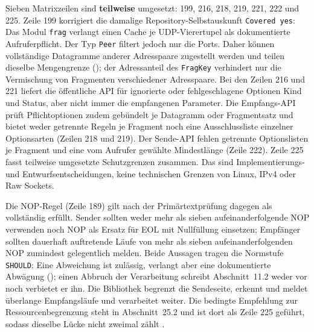 Sieben Matrixzeilen sind \textbf{teilweise} umgesetzt: 199, 216, 218, 219, 221, 222 und 225. Zeile 199
korrigiert die damalige Repository-Selbstauskunft \texttt{Covered yes}: Das Modul \texttt{frag} verlangt
einen Cache je UDP-Vierertupel als dokumentierte Aufrufer\-pflicht. Der Typ \texttt{Peer} filtert jedoch
nur die Ports. Daher können vollständige Datagramme anderer Adresspaare zugestellt werden und teilen
dieselbe Mengengrenze (); der Adressanteil des \texttt{FragKey} verhindert
nur die Vermischung von Fragmenten verschiedener Adresspaare. Bei den
Zeilen 216 und 221 liefert die öffentliche
API für ignorierte oder fehlgeschlagene Optionen Kind und Status, aber nicht immer die empfangenen
Parameter. Die Empfangs-API prüft Pflichtoptionen zudem gebündelt je Datagramm oder Fragmentsatz und
bietet weder getrennte Regeln je Fragment noch eine Ausschlussliste einzelner Options\-arten (Zeilen 218
und 219). Der Sende-API fehlen getrennte Optionslisten je Fragment und eine vom Aufrufer gewählte
Mindestlänge (Zeile 222). Zeile 225 fasst teilweise umgesetzte Schutzgrenzen zusammen. Das sind
Implementierungs- und Entwurfsentscheidungen, keine technischen Grenzen von Linux, IPv4 oder Raw Sockets.

Die NOP-Regel (Zeile 189) gilt nach der Primärtextprüfung dagegen als vollständig erfüllt. Sender sollten
weder mehr als sieben aufeinanderfolgende NOP verwenden noch NOP als Ersatz für EOL mit Nullfüllung
einsetzen; Empfänger sollten dauerhaft auftretende Läufe von mehr als sieben aufeinanderfolgenden NOP
zumindest gelegentlich melden. Beide Aussagen tragen die Normstufe \texttt{SHOULD}: Eine Abweichung ist
zulässig, verlangt aber eine dokumentierte Abwägung (); einen Abbruch der
Verarbeitung schreibt Abschnitt~11.2 weder vor noch verbietet er ihn. Die Bibliothek begrenzt die
Sendeseite, erkennt
und meldet überlange Empfangsläufe und verarbeitet weiter. Die bedingte Empfehlung zur
Ressourcenbegrenzung steht in Abschnitt~25.2 und ist dort als Zeile 225 geführt, sodass dieselbe Lücke
nicht zweimal zählt \cite[Sec.~11.2 und 25.2]{rfc9868}.

